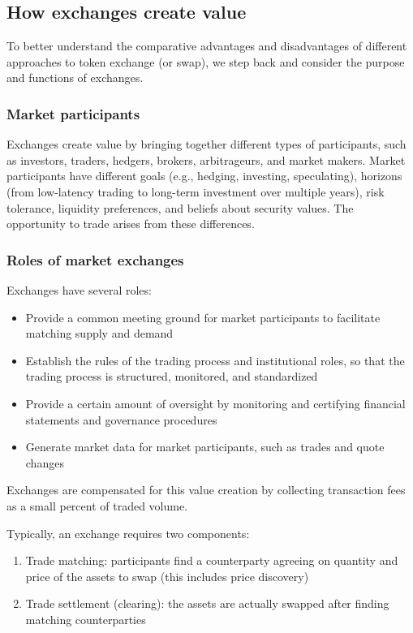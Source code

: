\documentclass[11pt, reqno]{amsart}
\theoremstyle{definition}
\theoremstyle{remark}
\begin{document}
\subsection{How exchanges create value}
To better understand the comparative advantages and disadvantages of different
approaches to token exchange (or swap), we step back and consider the purpose and
functions of exchanges.

\subsubsection{Market participants}
Exchanges create value by bringing together different types of participants,
such as investors, traders, hedgers, brokers, arbitrageurs, and market makers.
Market participants have different goals (e.g., hedging, investing,
speculating), horizons (from low-latency trading to long-term investment over
multiple years), risk tolerance, liquidity preferences, and beliefs about
security values. The opportunity to trade arises from these differences.

\subsubsection{Roles of market exchanges}

Exchanges have several roles:
\begin{itemize}
    \item Provide a common meeting ground for market participants to
          facilitate matching supply and demand
	\item Establish the rules of the trading process and institutional roles, so
          that the trading process is structured, monitored, and standardized
	\item Provide a certain amount of oversight by monitoring and certifying
          financial statements and governance procedures
    \item Generate market data for market participants, such as trades and
          quote changes
\end{itemize}

Exchanges are compensated for this value creation by collecting transaction
fees as a small percent of traded volume.

Typically, an exchange requires two components:
\begin{enumerate}
	\item Trade matching: participants find a counterparty agreeing on quantity
	      and price of the assets to swap (this includes price discovery)
    \item Trade settlement (clearing): the assets are actually swapped after
          finding matching counterparties
\end{enumerate}
\end{document}
